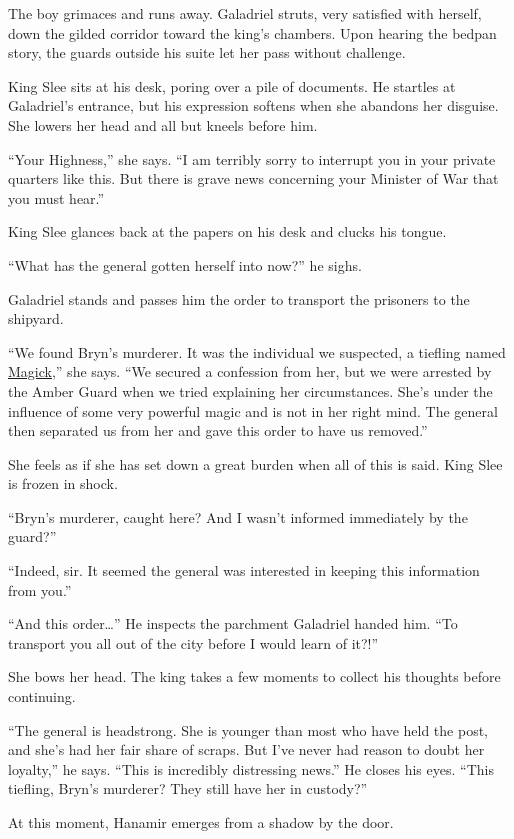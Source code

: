 \documentclass[smalldemyvopaper,11pt,twoside,onecolumn,openright,extrafontsizes]{memoir}
\begin{document}
The boy grimaces and runs away. Galadriel struts, very satisfied with
herself, down the gilded corridor toward the king's chambers. Upon
hearing the bedpan story, the guards outside his suite let her pass
without challenge.

King Slee sits at his desk, poring over a pile of documents. He startles
at Galadriel's entrance, but his expression softens when she abandons
her disguise. She lowers her head and all but kneels before him.

``Your Highness,'' she says. ``I am terribly sorry to interrupt you in
your private quarters like this. But there is grave news concerning your
Minister of War that you must hear.''

King Slee glances back at the papers on his desk and clucks his tongue.

``What has the general gotten herself into now?'' he sighs.

Galadriel stands and passes him the order to transport the prisoners to
the shipyard.

``We found Bryn's murderer. It was the individual we suspected, a
tiefling named \href{/characters/magick/}{Magick},'' she says. ``We
secured a confession from her, but we were arrested by the Amber Guard
when we tried explaining her circumstances. She's under the influence of
some very powerful magic and is not in her right mind. The general then
separated us from her and gave this order to have us removed.''

She feels as if she has set down a great burden when all of this is
said. King Slee is frozen in shock.

``Bryn's murderer, caught here? And I wasn't informed immediately by the
guard?''

``Indeed, sir. It seemed the general was interested in keeping this
information from you.''

``And this order\ldots{}'' He inspects the parchment Galadriel handed
him. ``To transport you all out of the city before I would learn of
it?!''

She bows her head. The king takes a few moments to collect his thoughts
before continuing.

``The general is headstrong. She is younger than most who have held the
post, and she's had her fair share of scraps. But I've never had reason
to doubt her loyalty,'' he says. ``This is incredibly distressing
news.'' He closes his eyes. ``This tiefling, Bryn's murderer? They still
have her in custody?''

At this moment, Hanamir emerges from a shadow by the door.
\end{document}
